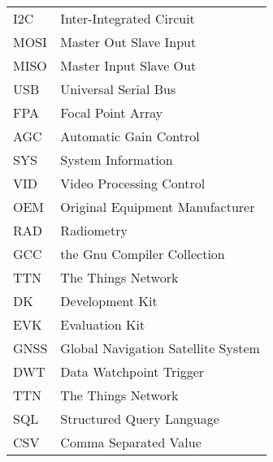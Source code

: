 \begin{flushleft}
\begin{longtable}[l]{p{2.5cm}l}
        I2C     & Inter-Integrated Circuit\\
        MOSI    & Master Out Slave Input\\
        MISO    & Master Input Slave Out \\
        USB     & Universal Serial Bus\\
        FPA     & Focal Point Array\\
        AGC     & Automatic Gain Control\\
        SYS     & System Information\\
        VID     & Video Processing Control\\
        OEM     & Original Equipment Manufacturer\\
        RAD     & Radiometry\\
        GCC     & the Gnu Compiler Collection\\
        TTN     & The Things Network\\
        DK      & Development Kit\\
        EVK     & Evaluation Kit\\
        GNSS    & Global Navigation Satellite System\\
        DWT     & Data Watchpoint Trigger\\
        TTN     & The Things Network\\
        SQL     & Structured Query Language\\
        CSV     & Comma Separated Value\\
\end{longtable}
\end{flushleft}
\endgroup

\newpage
